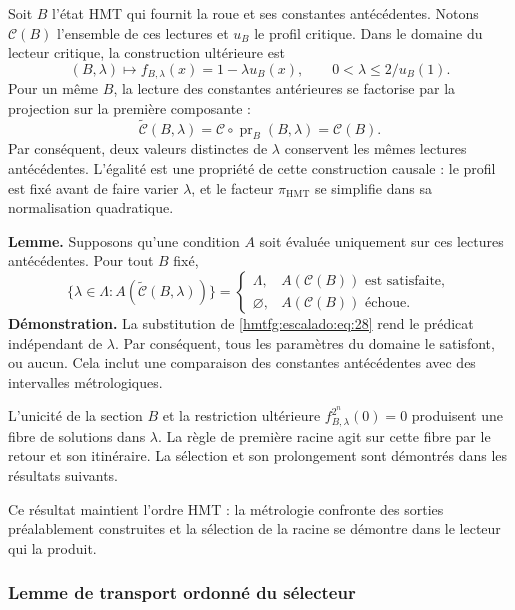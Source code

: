Soit \(B\) l’état HMT qui fournit la roue et ses constantes antécédentes. Notons \(\mathcal C(B)\) l’ensemble de ces lectures et \(u_B\) le profil critique. Dans le domaine du lecteur critique, la construction ultérieure est
\begin{equation}
(B,\lambda)\longmapsto f_{B,\lambda}(x)=1-\lambda u_B(x),
\qquad 0<\lambda\le 2/u_B(1).
\label{hmtfg:escalado:eq:27}
\end{equation}
Pour un même \(B\), la lecture des constantes antérieures se factorise par la projection sur la première composante :
\begin{equation}
\widetilde{\mathcal C}(B,\lambda)
=\mathcal C\circ\operatorname{pr}_B(B,\lambda)
=\mathcal C(B).
\label{hmtfg:escalado:eq:28}
\end{equation}
Par conséquent, deux valeurs distinctes de \(\lambda\) conservent les mêmes lectures antécédentes. L’égalité est une propriété de cette construction causale : le profil est fixé avant de faire varier \(\lambda\), et le facteur \(\pi_{\mathrm{HMT}}\) se simplifie dans sa normalisation quadratique.

\textbf{Lemme.} Supposons qu’une condition \(A\) soit évaluée uniquement sur ces lectures antécédentes. Pour tout \(B\) fixé,
\begin{equation}
\{\lambda\in\Lambda:A(\widetilde{\mathcal C}(B,\lambda))\}
=
\begin{cases}
\Lambda,&A(\mathcal C(B))\text{ est satisfaite},\\
\varnothing,&A(\mathcal C(B))\text{ échoue}.
\end{cases}
\label{hmtfg:escalado:eq:29}
\end{equation}
\textbf{Démonstration.} La substitution de \eqref{hmtfg:escalado:eq:28} rend le prédicat indépendant de \(\lambda\). Par conséquent, tous les paramètres du domaine le satisfont, ou aucun. Cela inclut une comparaison des constantes antécédentes avec des intervalles métrologiques.

L’unicité de la section \(B\) et la restriction ultérieure \(f_{B,\lambda}^{2^n}(0)=0\) produisent une fibre de solutions dans \(\lambda\). La règle de première racine agit sur cette fibre par le retour et son itinéraire. La sélection et son prolongement sont démontrés dans les résultats suivants.

Ce résultat maintient l’ordre HMT : la métrologie confronte des sorties préalablement construites et la sélection de la racine se démontre dans le lecteur qui la produit.

\subsubsection{Lemme de transport ordonné du sélecteur}
\label{hmtfg:escalado:13.3}


